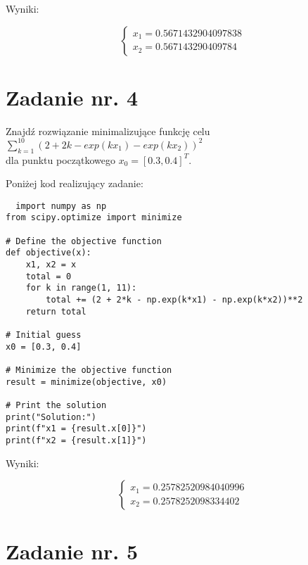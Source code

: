 \documentclass{article}
\begin{document}
Wyniki:

\begin{equation}
  \begin{cases}
    x_1=0.5671432904097838\\
    x_2=0.567143290409784
  \end{cases}
\end{equation}

\section{Zadanie nr. 4}
Znajdź rozwiązanie minimalizujące funkcję celu\\
$\sum_{k=1}^{10}(2+2k-exp(kx_1)-exp(kx_2))^2$\\
dla punktu początkowego $x_0=[0.3, 0.4]^T$.

Poniżej kod realizujący zadanie:

\begin{lstlisting}
  import numpy as np
from scipy.optimize import minimize

# Define the objective function
def objective(x):
    x1, x2 = x
    total = 0
    for k in range(1, 11):
        total += (2 + 2*k - np.exp(k*x1) - np.exp(k*x2))**2
    return total

# Initial guess
x0 = [0.3, 0.4]

# Minimize the objective function
result = minimize(objective, x0)

# Print the solution
print("Solution:")
print(f"x1 = {result.x[0]}")
print(f"x2 = {result.x[1]}")
\end{lstlisting}

Wyniki:

\begin{equation}
  \begin{cases}
    x_1=0.25782520984040996\\
    x_2=0.2578252098334402
  \end{cases}
\end{equation}

\section{Zadanie nr. 5}
\end{document}
